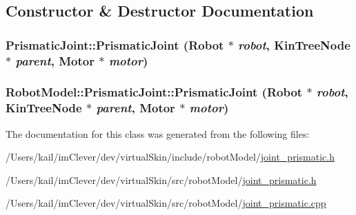 \subsection{Constructor \& Destructor Documentation}
\hypertarget{class_robot_model_1_1_prismatic_joint_a0a842b2415dafda9a87c854925fdc0b7}{
\subsubsection[{PrismaticJoint}]{\setlength{\rightskip}{0pt plus 5cm}PrismaticJoint::PrismaticJoint ({\bf Robot} $\ast$ {\em robot}, \/  {\bf KinTreeNode} $\ast$ {\em parent}, \/  {\bf Motor} $\ast$ {\em motor})}}
\label{class_robot_model_1_1_prismatic_joint_a0a842b2415dafda9a87c854925fdc0b7}
\hypertarget{class_robot_model_1_1_prismatic_joint_ac519746607de0857d42c6625f4e99e60}{
\subsubsection[{PrismaticJoint}]{\setlength{\rightskip}{0pt plus 5cm}RobotModel::PrismaticJoint::PrismaticJoint ({\bf Robot} $\ast$ {\em robot}, \/  {\bf KinTreeNode} $\ast$ {\em parent}, \/  {\bf Motor} $\ast$ {\em motor})}}
\label{class_robot_model_1_1_prismatic_joint_ac519746607de0857d42c6625f4e99e60}


The documentation for this class was generated from the following files:\begin{DoxyCompactItemize}
\item 
/Users/kail/imClever/dev/virtualSkin/include/robotModel/\hyperlink{include_2robot_model_2joint__prismatic_8h}{joint\_\-prismatic.h}\item 
/Users/kail/imClever/dev/virtualSkin/src/robotModel/\hyperlink{src_2robot_model_2joint__prismatic_8h}{joint\_\-prismatic.h}\item 
/Users/kail/imClever/dev/virtualSkin/src/robotModel/\hyperlink{joint__prismatic_8cpp}{joint\_\-prismatic.cpp}\end{DoxyCompactItemize}
